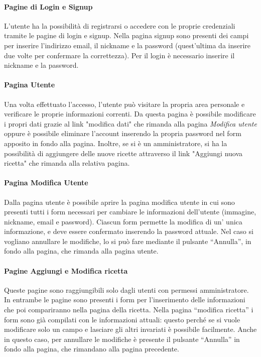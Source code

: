 \paragraph{Pagine di Login e Signup}
L'utente ha la possibilità di registrarsi o accedere con le proprie credenziali tramite le pagine di login e signup. Nella pagina signup sono presenti dei campi per inserire l'indirizzo email, il nickname e la password (quest'ultima da inserire due volte per confermare la correttezza). Per il login è necessario inserire il nickname e la password.

\paragraph{Pagina Utente}
Una volta effettuato l'accesso, l'utente può visitare la propria area personale e verificare le proprie informazioni correnti. Da questa pagina è possibile modificare i propri dati grazie al link "modifica dati" che rimanda alla pagina \textit{Modifica utente} oppure è possibile eliminare l'account inserendo la propria password nel form apposito in fondo alla pagina. Inoltre, se si è un amministratore, si ha la possibilità di aggiungere delle nuove ricette attraverso il link "Aggiungi nuova ricetta" che rimanda alla relativa pagina.

\paragraph{Pagina Modifica Utente}
Dalla pagina utente è possibile aprire la pagina modifica utente in cui sono presenti tutti i form necessari per cambiare le informazioni dell'utente (immagine, nickname, email e password). Ciascun form permette la modifica di un' unica informazione, e deve essere confermato inserendo la password attuale. Nel caso si vogliano annullare le modifiche, lo si può fare mediante il pulsante ``Annulla'', in fondo alla pagina, che rimanda alla pagina utente.

\paragraph{Pagine Aggiungi e Modifica ricetta}
Queste pagine sono raggiungibili solo dagli utenti con permessi amministratore. In entrambe le pagine sono presenti i form per l'inserimento delle informazioni che poi compariranno nella pagina della ricetta. Nella pagina ``modifica ricetta'' i form sono già compilati con le informazioni attuali: questo perché se si vuole modificare solo un campo e lasciare gli altri invariati è possibile facilmente. Anche in questo caso, per annullare le modifiche è presente il pulsante ``Annulla'' in fondo alla pagina, che rimandano alla pagina precedente.

